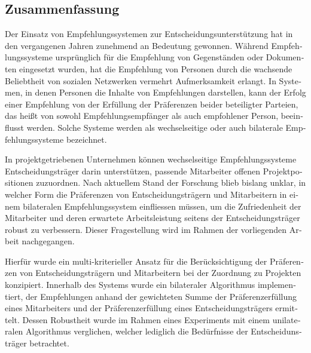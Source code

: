 \begin{otherlanguage}{ngerman}
\chapter*{Zusammenfassung}
Der Einsatz von Empfehlungssystemen zur Entscheidungsunterstützung hat in den vergangenen Jahren zunehmend an Bedeutung gewonnen.
Während Empfehlungssysteme ursprünglich für die Empfehlung von Gegenständen oder Dokumenten eingesetzt wurden, hat die Empfehlung von Personen durch die wachsende Beliebtheit von sozialen Netzwerken vermehrt Aufmerksamkeit erlangt.
In Systemen, in denen Personen die Inhalte von Empfehlungen darstellen, kann der Erfolg einer Empfehlung von der Erfüllung der Präferenzen beider beteiligter Parteien, das heißt von sowohl Empfehlungsempfänger als auch empfohlener Person, beeinflusst werden.
Solche Systeme werden als wechselseitige oder auch bilaterale Empfehlungssysteme bezeichnet.

In projektgetriebenen Unternehmen können wechselseitige Empfehlungssysteme Entscheidungsträger darin unterstützen, passende Mitarbeiter offenen Projektpositionen zuzuordnen.
Nach aktuellem Stand der Forschung blieb bislang unklar, in welcher Form die Präferenzen von Entscheidungsträgern und Mitarbeitern in einem bilateralen Empfehlungssystem einfliessen müssen, um die Zufriedenheit der Mitarbeiter und deren erwartete Arbeitsleistung seitens der Entscheidungsträger robust zu verbessern.
Dieser Fragestellung wird im Rahmen der vorliegenden Arbeit nachgegangen.

Hierfür wurde ein multi-kriterieller Ansatz für die Berücksichtigung der Präferenzen von Entscheidungsträgern und Mitarbeitern bei der Zuordnung zu Projekten konzipiert.
Innerhalb des Systems wurde ein bilateraler Algorithmus implementiert, der Empfehlungen anhand der gewichteten Summe der Präferenzerfüllung eines Mitarbeiters und der Präferenzerfüllung eines Entscheidungsträgers ermittelt.
Dessen Robustheit wurde im Rahmen eines Experiments mit einem unilateralen Algorithmus verglichen, welcher lediglich die Bedürfnisse der Entscheidunsträger betrachtet.


\end{otherlanguage}
